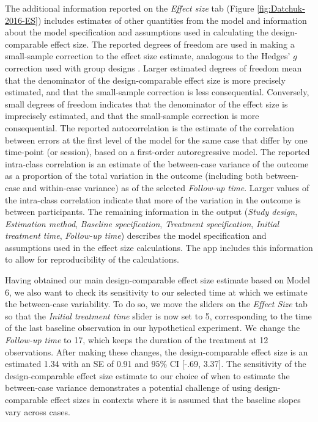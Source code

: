\documentclass[
]{book}
\begin{document}
The additional information reported on the \emph{Effect size} tab (Figure \ref{fig:Datchuk-2016-ES}) includes estimates of other quantities from the model and information about the model specification and assumptions used in calculating the design-comparable effect size. The reported degrees of freedom are used in making a small-sample correction to the effect size estimate, analogous to the Hedges' \(g\) correction used with group designs \citep{Hedges1981distribution}. Larger estimated degrees of freedom mean that the denominator of the design-comparable effect size is more precisely estimated, and that the small-sample correction is less consequential. Conversely, small degrees of freedom indicates that the denominator of the effect size is imprecisely estimated, and that the small-sample correction is more consequential. The reported autocorrelation is the estimate of the correlation between errors at the first level of the model for the same case that differ by one time-point (or session), based on a first-order autoregressive model. The reported intra-class correlation is an estimate of the between-case variance of the outcome as a proportion of the total variation in the outcome (including both between-case and within-case variance) as of the selected \emph{Follow-up time}. Larger values of the intra-class correlation indicate that more of the variation in the outcome is between participants. The remaining information in the output (\emph{Study design}, \emph{Estimation method}, \emph{Baseline specification}, \emph{Treatment specification}, \emph{Initial treatment time}, \emph{Follow-up time}) describes the model specification and assumptions used in the effect size calculations. The app includes this information to allow for reproducibility of the calculations.

Having obtained our main design-comparable effect size estimate based on Model 6, we also want to check its sensitivity to our selected time at which we estimate the between-case variability. To do so, we move the sliders on the \emph{Effect Size} tab so that the \emph{Initial treatment time} slider is now set to 5, corresponding to the time of the last baseline observation in our hypothetical experiment. We change the \emph{Follow-up time} to 17, which keeps the duration of the treatment at 12 observations. After making these changes, the design-comparable effect size is an estimated 1.34 with an SE of 0.91 and \(95\%\) CI {[}-.69, 3.37{]}. The sensitivity of the design-comparable effect size estimate to our choice of when to estimate the between-case variance demonstrates a potential challenge of using design-comparable effect sizes in contexts where it is assumed that the baseline slopes vary across cases.
\end{document}
